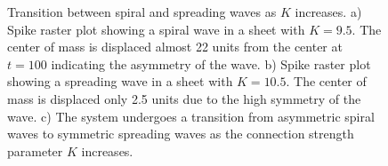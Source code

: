 \begin{figure}[!htb]
 \caption{Transition between spiral and spreading waves as $K$ increases.
          a) Spike raster plot showing a spiral wave in a sheet with $K=9.5$. The center of mass is displaced almost 22 units from the center at $t=100$ indicating the asymmetry of the wave.
          b) Spike raster plot showing a spreading wave in a sheet with $K=10.5$. The center of mass is displaced only 2.5 units due to the high symmetry of the wave.
          c) The system undergoes a transition from asymmetric spiral waves to symmetric spreading waves as the connection strength parameter $K$ increases.
          } 
 \label{fig:2DWaveTransition}
\end{figure}
 \FloatBarrier

